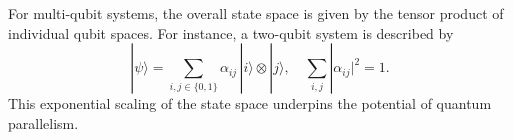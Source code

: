 \begin{observation}
For multi-qubit systems, the overall state space is given by the tensor product of individual qubit spaces. For instance, a two-qubit system is described by
\[
|\psi\rangle = \sum_{i,j \in \{0,1\}} \alpha_{ij}\, |i\rangle \otimes |j\rangle, \quad \sum_{i,j} |\alpha_{ij}|^2 = 1.
\]
This exponential scaling of the state space underpins the potential of quantum parallelism.
\end{observation}


